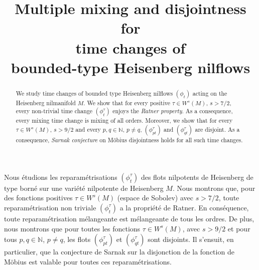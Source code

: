 \documentclass[JEP,XML,SOM,Unicode,NoEqCountersInSection]{cedram}
\theoremstyle{definition}
\theoremstyle{plain}
\begin{document}
\title[Multiple mixing and disjointness for time changes of bounded-type Heisenberg nilflows]{Multiple mixing and disjointness for\\ time changes of\\ bounded-type Heisenberg nilflows}

\author[\initial{G.} \lastname{Forni}]{ }
\address{Department of Mathematics, University of Maryland\\
4176 Campus Drive -- William E. Kirwan Hall, College Park, MD 20742-4015, USA}

\author[\initial{A.} \lastname{Kanigowski}]{ }
\address{Department of Mathematics, University of Maryland\\
4176 Campus Drive -- William E. Kirwan Hall, College Park, MD 20742-4015, USA}

\begin{abstract}
We study time changes of bounded type Heisenberg nilflows $(\phi_t)$ acting on the Heisenberg nilmanifold $M$. We show that for every positive $\tau\in W^s(M)$, $s > 7/2$, every non-trivial time change $(\phi_t^{\tau})$ enjoys the \emph{Ratner property}. As a consequence, every mixing time change is mixing of all orders. Moreover, we show that for every $\tau\in W^s(M)$, $s>9/2$ and every $p,q\in \mathbb{N}$, $p\neq q$, $(\phi_{pt}^\tau)$ and $(\phi_{qt}^\tau)$ are disjoint. As a consequence, \emph{Sarnak conjecture} on Möbius disjointness holds for all such time changes.
\end{abstract}





\begin{altabstract}
Nous étudions les reparamétrisations $(\phi^\tau_t)$ des flots nilpotents de Heisenberg de type borné sur une variété nilpotente de Heisenberg $M$. Nous montrons que, pour des fonctions positives $\tau \in W^s (M)$ (espace de Sobolev) avec $s> 7/2$, toute reparamétrisation non triviale $(\phi^\tau_t)$ a la propriété de Ratner. En conséquence, toute reparamétrisation mélangeante est mélangeante de tous les ordres. De plus, nous montrons que pour toutes les fonctions $\tau \in W^s (M)$, avec $s> 9/2$ et pour tous $p, q \in\mathbb N$, $ p\neq q$, les flots $(\phi^\tau_{pt})$ et $(\phi^\tau_{qt})$ sont disjoints. Il s'ensuit, en particulier, que la conjecture de Sarnak sur la disjonction de la fonction de Möbius est valable pour toutes ces reparamétrisations.
\end{altabstract}
\end{document}

